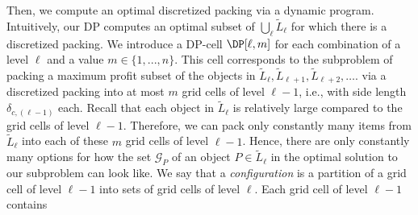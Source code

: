 Then, we compute an optimal
discretized packing via a dynamic program. Intuitively, our DP computes
an optimal subset of $\bigcup_{\ell}\tilde{L}_{\ell}$ for which there is a discretized
packing. %
We introduce a DP-cell %
$\DP[\ell,m]$ for each combination of a level $\ell$ and a value
$m\in\{1,...,n\}$. This cell corresponds to the subproblem of packing
a maximum profit subset of the objects in $\tilde{L}_{\ell},\tilde{L}_{\ell+1},\tilde{L}_{\ell+2},\dots.$
via a discretized packing into at most $m$ grid cells of level $\ell-1$,
i.e., with side length $\delta_{c,(\ell-1)}$ each. Recall that each
object in $\tilde{L}_{\ell}$ is relatively large compared to the grid cells
of level $\ell-1$. Therefore, we can pack only constantly many items
from $\tilde{L}_{\ell}$ into each of these $m$ grid cells of level $\ell-1$.
Hence, there are only constantly many options for how the set $\mathcal{G}_{P}$
of an object $P\in \tilde{L}_{\ell}$ in the optimal solution to our subproblem
can look like. We say that a \emph{configuration} is a
partition of a grid cell of level $\ell-1$ into sets of grid cells of level $\ell$.
Each grid cell of level $\ell-1$ contains
